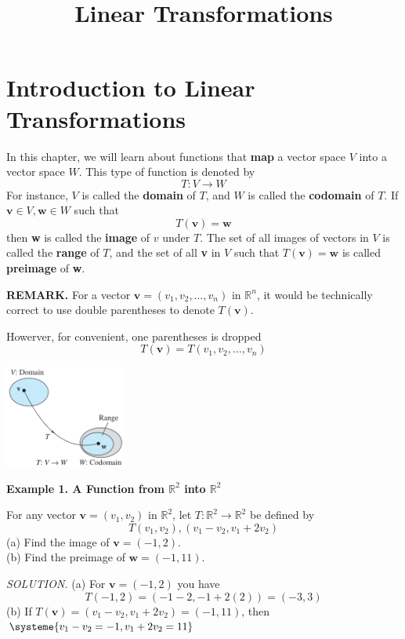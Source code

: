 \documentclass{article}
\title{Linear Transformations}
\date{}
\newcommand\B{\textbf}
\newcommand\R{\mathbb{R}}
\begin{document}
    \part{Introduction to Linear Transformations}
    In this chapter, we will learn about functions that \textbf{map} a vector space $V$ into a vector space $W$. 
    This type of function is denoted by 
    \[T: V \to W \]
    For instance, $V$ is called the \textbf{domain} of $T$, and $W$ is called the \textbf{codomain} of $T$.  If $\B{v} \in V, \B{w} \in W$
    such that \[T(\B{v}) = \B{w}\]
    then \B{w} is called the \textbf{image} of $v$ under $T$. The set of all images of vectors in $V$ is called the \textbf{range}
    of $T$, and the set of all \B{v} in $V$ such that $T(\B{v}) = \B{w}$ is called \textbf{preimage} of \B{w}.

   \begin{minipage}{0.6\linewidth}
       \textbf{REMARK.} For a vector $\B{v} = (v_1, v_2, \dots, v_n)$ in $\R^n$, it would be technically correct to use 
       double parentheses to denote $T(\B{v})$.

       Howerver, for convenient, one parentheses is dropped
       \[T(\B{v}) = T(v_1, v_2, \dots, v_n)\]
   \end{minipage} 
   \begin{minipage}{0.3\linewidth}
       \begin{flushright}
           \includegraphics[width = 4cm]{images/tw1.png}
       \end{flushright}
   \end{minipage}

   \textbf{Example 1. \textcolor{blue5}{A Function from $\R^2$ into $\R^2$}}
   
   For any vector $\B{v} = (v_1, v_2)$ in $\R^2$, let $T: \R^2 \to \R^2$ be defined by
   \[T(v_1, v_2), (v_1 - v_2, v_1 + 2v_2)\]
    (a) Find the image of $\B{v} = (-1, 2)$.\\
    (b) Find the preimage of $\B{w} = (-1, 11)$.

    \textcolor{blue5}{ \textit{SOLUTION.} } (a) For $\B{v} = (-1, 2)$ you have
    \[T(-1, 2) = (-1 - 2, -1 + 2(2)) = (-3, 3)\]
    (b) If $T(\B{v}) = (v_1 - v_2, v _1 + 2 v_2) = (-1, 11)$, then 
    $\systeme {
        v_1 - v_2 = -1,
        v_1 + 2v_2 = 11
    }$
\end{document}
